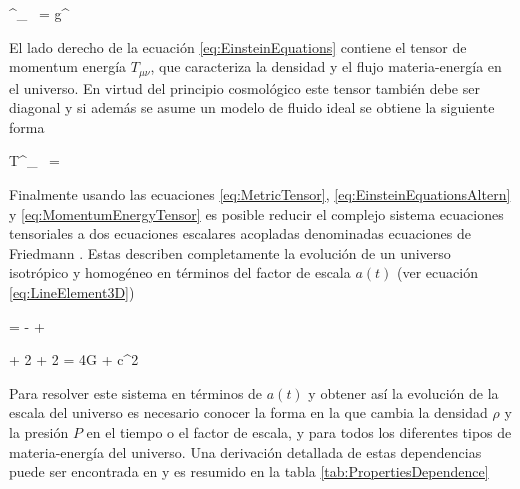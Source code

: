 { \Gamma^\nu _{\ \alpha \beta}  = g^{\mu \sigma}
 }


El lado derecho de la ecuación \ref{eq:EinsteinEquations} contiene el 
tensor de momentum energía $T_{\mu \nu}$, que caracteriza la densidad y el 
flujo materia-energía en el universo. En virtud del principio cosmológico
este tensor también debe ser diagonal y si además se asume un modelo de 
fluido ideal se obtiene la siguiente forma


{T^\mu_{\ \nu} = }


Finalmente usando las ecuaciones \ref{eq:MetricTensor}, 
\ref{eq:EinsteinEquationsAltern} y \ref{eq:MomentumEnergyTensor} es posible 
reducir el complejo sistema ecuaciones tensoriales a dos ecuaciones 
escalares acopladas denominadas ecuaciones de Friedmann \cite{longair2008}. 
Estas describen completamente la evolución de un universo isotrópico y 
homogéneo en términos del factor de escala $a(t)$ (ver ecuación
\ref{eq:LineElement3D})


{  = -
+ }


{  + 2 + 2 =
4\pi G  + c^2 \Lambda}


Para resolver este sistema en términos de $a(t)$ y obtener así la evolución 
de la escala del universo es necesario conocer la forma en la que cambia la 
densidad $\rho$ y la presión $P$ en el tiempo o el factor de escala, y para 
todos los diferentes tipos de materia-energía del universo. Una derivación 
detallada de estas dependencias puede ser encontrada en \cite{longair2008} y
es resumido en la tabla \ref{tab:PropertiesDependence}

